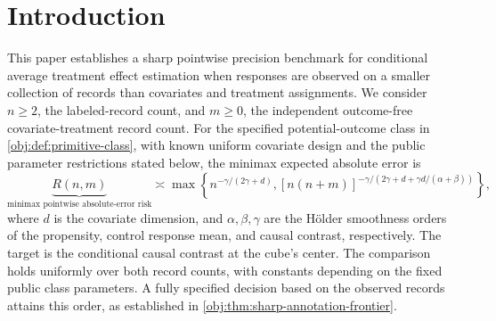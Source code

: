 \begin{abstract}
We characterize the value of outcome-free covariate-treatment records for estimating a conditional average treatment effect at the center of the unit covariate cube. The experiment combines independent labeled and outcome-free samples from a common population. Under a known uniform covariate design, conditional exchangeability, a public overlap level \(0<\varepsilon<1/2\) with propensity values in \([\varepsilon,1-\varepsilon]\), binary responses with arm means in \([0,1]\), and public Hölder regularity, we establish the sharp minimax expected absolute-error rate uniformly over labeled counts of at least two and every nonnegative auxiliary count. The propensity and control-mean smoothness orders lie in \((0,1]\), the contrast smoothness order lies in \([1,3]\), and the common public Hölder radius satisfies \(L>1/2\). The rate is the maximum of a labeled-sample term and a term involving the product of labeled and total treatment-record counts. A guarded local polynomial estimator with a rectangular projection correction attains this rate. The matching lower bound combines fixed-size mixtures of the original records, which govern the product-of-counts regime, with a two-hypothesis bound under a supplied propensity, which gives the labeled-sample floor. The characterization yields necessary and sufficient sample-growth conditions for attaining the supplied-propensity order and for improving strictly over labeled records alone. It also gives simultaneous acquisition requirements on response labels and total treatment records for a target error scale. The rate exponents do not depend on \(\varepsilon\), while the comparison constants may depend on it together with the other fixed public parameters.
\end{abstract}

\section{Introduction}\label{sec:introduction}

This paper establishes a sharp pointwise precision benchmark for conditional average treatment effect estimation when responses are observed on a smaller collection of records than covariates and treatment assignments. We consider \(n\ge2\), the labeled-record count, and \(m\ge0\), the independent outcome-free covariate-treatment record count. For the specified potential-outcome class in \cref{obj:def:primitive-class}, with known uniform covariate design and the public parameter restrictions stated below, the minimax expected absolute error is
\[
\underbrace{R(n,m)}_{\text{minimax pointwise absolute-error risk}}
\asymp
\max\left\{
n^{-\gamma/(2\gamma+d)},
[n(n+m)]^{-\gamma/(2\gamma+d+\gamma d/(\alpha+\beta))}
\right\},
\]
where \(d\) is the covariate dimension, and \(\alpha,\beta,\gamma\) are the Hölder smoothness orders of the propensity, control response mean, and causal contrast, respectively. The target is the conditional causal contrast at the cube's center. The comparison holds uniformly over both record counts, with constants depending on the fixed public class parameters. A fully specified decision based on the observed records attains this order, as established in \cref{obj:thm:sharp-annotation-frontier}.

